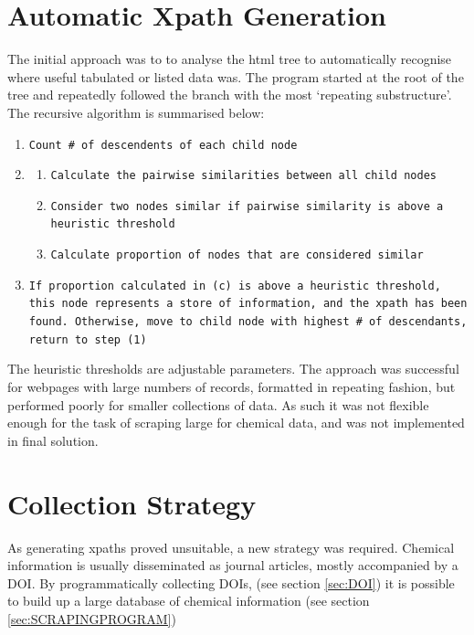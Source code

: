\section{Automatic Xpath Generation}
The initial approach was to to analyse the html tree to automatically recognise where useful tabulated or listed data was. The program started at the root of the tree and repeatedly followed the branch with the most `repeating substructure'. The recursive algorithm is summarised below:
\begin{sloppypar}
\begin{enumerate}
\item \texttt{Count \# of descendents of each child node}
\item \begin{enumerate}
\item \texttt{Calculate the pairwise similarities between all child nodes}
\item \texttt{Consider  two nodes similar if pairwise similarity is above a heuristic threshold}
\item \texttt{Calculate proportion of nodes that are considered similar}
\end{enumerate}
\item \texttt{If proportion calculated in (c) is above a heuristic threshold, this node represents a store of information, and the xpath has been found. Otherwise, move to child node with highest \# of descendants, return to step (1)}
\end{enumerate}
\end{sloppypar}
The heuristic thresholds are adjustable parameters. The approach was successful for webpages with large numbers of records, formatted in repeating fashion, but performed poorly for smaller collections of data. As such it was not flexible enough for the task of scraping large for chemical data, and was not implemented in final solution.
\section{Collection Strategy}
As generating xpaths proved unsuitable, a new strategy was required. Chemical information is usually disseminated as journal articles, mostly accompanied by a DOI. By programmatically collecting DOIs, (see section \ref{sec:DOI}) it is possible to build up a large database of chemical information (see section \ref{sec:SCRAPINGPROGRAM})
